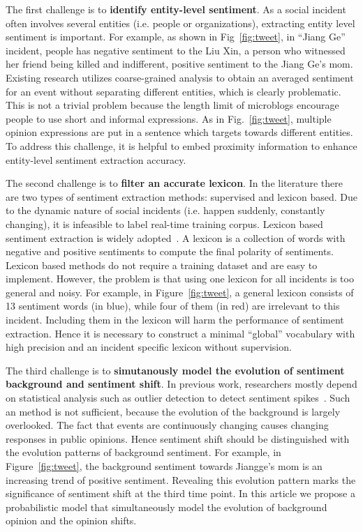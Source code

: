 \documentclass[runningheads]{llncs}
\begin{document}
The first challenge is to \textbf{identify entity-level sentiment}. 
As a social incident often involves several entities (i.e. people or organizations), extracting entity level sentiment is important.
For example, as shown in Fig~\ref{fig:tweet}, in ``Jiang Ge'' incident, people has negative sentiment to the Liu Xin, a person who witnessed her friend being killed and indifferent, positive sentiment to the Jiang Ge's mom. %
Existing research utilizes coarse-grained analysis to obtain an averaged sentiment for an event without separating different entities, which is clearly problematic.%
This is not a trivial problem because the length limit of microblogs encourage people to use short and informal expressions.
As in Fig.~\ref{fig:tweet}, multiple opinion expressions are put in a sentence which targets towards different entities. %
To address this challenge, it is helpful to embed proximity information to enhance entity-level sentiment extraction accuracy. 

The second challenge is to \textbf{filter an accurate lexicon}. 
In the literature there are two types of sentiment extraction methods: supervised and lexicon based.
Due to the dynamic nature of social incidents (i.e. happen suddenly, constantly changing), it is infeasible to label real-time training corpus. %
Lexicon based sentiment extraction is widely adopted~\cite{sentistrength2010,Thelwall2012lexicon,Ortega2013lexicon}. 
A lexicon is a collection of words with negative and positive sentiments to compute the final polarity of sentiments. 
Lexicon based methods do not require a training dataset and are easy to implement. 
However, the problem is that using one lexicon for all incidents is too general and noisy. %
For example, in Figure~\ref{fig:tweet}, a general lexicon consists of 13 sentiment words (in blue), while four of them (in red) are irrelevant to this incident. Including them in the lexicon will harm the performance of sentiment extraction.
Hence it is necessary to construct a minimal ``global'' vocabulary with high precision and an incident specific lexicon without supervision.

The third challenge is to \textbf{simutanously model the evolution of sentiment background and sentiment shift}.
In previous work, researchers mostly depend on statistical analysis such as outlier detection to detect sentiment spikes~\cite{Giachanou2016sentichange,Giachanou2017sentichange,Giachanou2016sentitime}.
Such an method is not sufficient, because the evolution of the background is largely overlooked.
The fact that events are continuously changing causes changing responses in public opinions. Hence sentiment shift should be distinguished with the evolution patterns of background sentiment.  
For example, in Figure~\ref{fig:tweet}, the background sentiment towards Jiangge's mom is an increasing trend of positive sentiment. Revealing this evolution pattern marks the significance of sentiment shift at the third time point. %
In this article we propose a probabilistic model that simultaneously model the evolution of background opinion and the opinion shifts.
\end{document}

